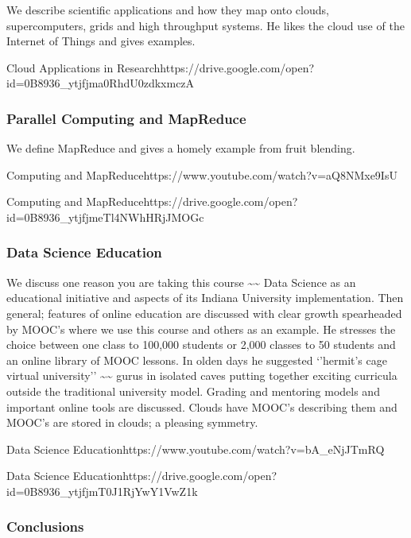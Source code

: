 We describe scientific applications and how they map onto clouds,
supercomputers, grids and high throughput systems. He likes the cloud
use of the Internet of Things and gives examples.




  {Cloud  Applications in Research}{https://drive.google.com/open?id=0B8936_ytjfjma0RhdU0zdkxmczA}

\subsubsection{Parallel Computing and
MapReduce}\label{parallel-computing-and-mapreduce}

We define MapReduce and gives a homely example from fruit blending.


  {Computing and  MapReduce}{https://www.youtube.com/watch?v=aQ8NMxe9IsU}


  {Computing  and MapReduce}{https://drive.google.com/open?id=0B8936_ytjfjmeTl4NWhHRjJMOGc}

\subsubsection{Data Science Education}\label{data-science-education}

We discuss one reason you are taking this course
\textasciitilde{}\textasciitilde{} Data Science as an educational
initiative and aspects of its Indiana University implementation. Then
general; features of online education are discussed with clear growth
spearheaded by MOOC's where we use this course and others as an example.
He stresses the choice between one class to 100,000 students or 2,000
classes to 50 students and an online library of MOOC lessons. In olden
days he suggested `'hermit's cage virtual university''
\textasciitilde{}\textasciitilde{} gurus in isolated caves putting
together exciting curricula outside the traditional university model.
Grading and mentoring models and important online tools are discussed.
Clouds have MOOC's describing them and MOOC's are stored in clouds; a
pleasing symmetry.


   {Data Science  Education}{https://www.youtube.com/watch?v=bA_eNjJTmRQ}


  {Data  Science Education}{https://drive.google.com/open?id=0B8936_ytjfjmT0J1RjYwY1VwZ1k}


\subsubsection{Conclusions}\label{conclusions}


